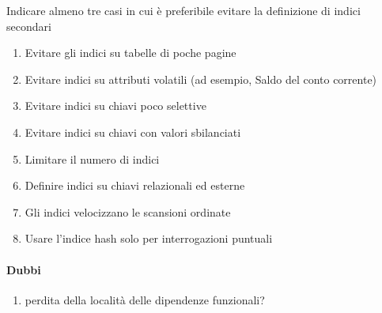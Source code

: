 \documentclass{exam}
\begin{document}
\begin{questions}
    \question Indicare almeno tre casi in cui è preferibile evitare la definizione di indici secondari
    \begin{solution}
        \begin{enumerate}
        \item Evitare gli indici su tabelle di poche pagine  
        \item Evitare indici su attributi volatili (ad esempio, Saldo del conto  corrente)  
        \item Evitare indici su chiavi poco selettive  
        \item Evitare indici su chiavi con valori sbilanciati  
        \item Limitare il numero di indici  
        \item Definire indici su chiavi relazionali ed esterne  
        \item Gli indici velocizzano le scansioni ordinate  
        \item Usare l'indice hash solo per interrogazioni puntuali 
        \end{enumerate}
    \end{solution}
\end{questions}



\paragraph{Dubbi}
\begin{enumerate}
    \item perdita della località delle dipendenze funzionali?
\end{enumerate}
\end{document}
